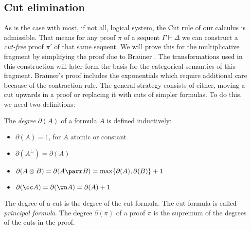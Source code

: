 \documentclass[DIN, pagenumber=false, fontsize=11pt, parskip=half, colorinlistoftodos, svgnames]{scrartcl}
\newcommand{\urgentnote}[2][]{\todo[color=red, #1]{#2}}
\begin{document}
	\subsection{Cut elimination }
	\label{cut-elimination}
	
	As is the case with most, if not all, logical system, the Cut rule of our calculus is admissible. 
	That means for any proof $\pi$ of a sequent $\Gamma \vdash \Delta $ we can construct a \emph{cut-free} proof $\pi'$ of that same sequent.  
	We will prove this for the multiplicative fragment by simplifying the proof due to Braüner \cite[Appendix B]{brauner}. 
	The transformations used in this construction will later form the basis for the categorical semantics of this fragment. 
	Braüner's proof includes the exponentials which require additional care because of the contraction rule. 
	The general strategy consists of either, moving a cut upwards in a proof or replacing it with cuts of simpler formulas. 
	To do this, we need two definitions:
	
	
	
	\begin{definition}[Degree]
		The \emph{degree} $\partial(A)$ of a formula $A$ is defined inductively:
		\begin{itemize}
			\item $\partial(A) = 1$, for $A$ atomic or constant
			\item $\partial \left(A^\bot\right) = \partial(A)$ 
			\item $\partial(A \otimes B) = \partial(A \parr B) = \max\{\partial(A), \partial(B)\} + 1$
			\item $\partial(\oc A ) = \partial(\wn A) = \partial(A) + 1$
		\end{itemize} 
		The degree of a cut is the degree of the cut formula. The cut formula is called \emph{principal formula}. The degree $\partial(\pi)$ of a proof $\pi$ is the supremum of the degrees of the cuts in the proof. 
	\end{definition}
	
\end{document}
